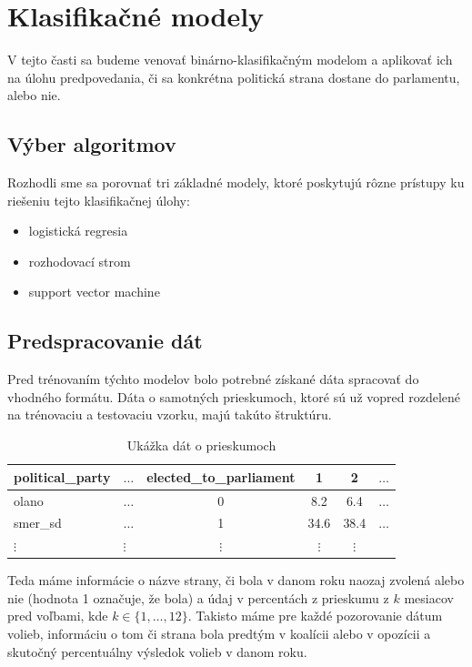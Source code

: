 \documentclass[main.tex]{subfiles}
\begin{document}
	
\section{Klasifikačné modely}	
V tejto časti sa budeme venovať binárno-klasifikačným modelom a aplikovať ich na úlohu predpovedania, či sa konkrétna politická strana dostane do parlamentu, alebo nie.

\subsection{Výber algoritmov}
Rozhodli sme sa porovnať tri základné modely, ktoré poskytujú rôzne prístupy ku riešeniu tejto klasifikačnej úlohy:

\begin{itemize}
    \item logistická regresia
    \item rozhodovací strom
    \item support vector machine
\end{itemize}

\subsection{Predspracovanie dát}
Pred trénovaním týchto modelov bolo potrebné získané dáta spracovať do vhodného formátu. Dáta o samotných prieskumoch, ktoré sú už vopred rozdelené na trénovaciu a testovaciu vzorku, majú takúto štruktúru.

\begin{table}[h!]
    \centering
    \caption{Ukážka dát o prieskumoch}
    \begin{tabular}{llcccl}
        \toprule
        \textbf{political\_party} & \textbf{$\ldots$} & \textbf{elected\_to\_parliament} & \textbf{1} & \textbf{2} & \textbf{$\ldots$} \\
        \midrule
        olano    & $\ldots$ & 0        & 8.2      & 6.4 & $\ldots$ \\
        smer\_sd & $\ldots$ & 1        & 34.6     & 38.4 & $\ldots$ \\
        $\vdots$ & $\vdots$ & $\vdots$ & $\vdots$ & $\vdots$ & \\  
        \bottomrule
    \end{tabular}
\end{table}

Teda máme informácie o názve strany, či bola v danom roku naozaj zvolená alebo nie (hodnota 1 označuje, že bola) a údaj v percentách z prieskumu z $k$ mesiacov pred voľbami, kde $k \in \{ 1, \ldots , 12 \}$. Takisto máme pre každé pozorovanie dátum volieb, informáciu o tom či strana bola predtým v koalícii alebo v opozícii a skutočný percentuálny výsledok volieb v danom roku.
\end{document}
